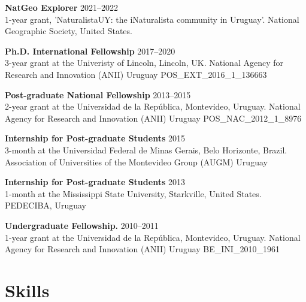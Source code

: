 \begin{innerlist}

\item[]{\bf NatGeo Explorer}
\hfill {2021--2022} \\
1-year grant, 'NaturalistaUY: the iNaturalista community in Uruguay'. National Geographic Society, United States.
\\

\item[]{\bf Ph.D. International Fellowship}
\hfill {2017--2020} \\
3-year grant at the Univeristy of Lincoln, Lincoln, UK. National Agency for Research and Innovation (ANII) Uruguay POS\_EXT\_2016\_1\_136663
\\

\item[]{\bf Post-graduate National Fellowship}
\hfill {2013--2015} \\
2-year grant at the Universidad de la Rep\'{u}blica, Montevideo, Uruguay. National Agency for Research and Innovation (ANII) Uruguay POS\_NAC\_2012\_1\_8976
\\

\item[]{\bf Internship for Post-graduate Students}
\hfill {2015} \\
3-month at the Universidad Federal de Minas Gerais, Belo Horizonte, Brazil. Association of Universities of the Montevideo Group (AUGM) Uruguay
\\

\item[]{\bf Internship for Post-graduate Students}
\hfill {2013} \\
1-month at the Mississippi State University, Starkville, United States. PEDECIBA, Uruguay
\\

\item[]{\bf Undergraduate Fellowship.}
\hfill {2010--2011} \\
1-year grant at the Universidad de la Rep\'{u}blica, Montevideo, Uruguay. National Agency for Research and Innovation (ANII) Uruguay BE\_INI\_2010\_1961
\\

\end{innerlist}

\HRule

\section{Skills}

